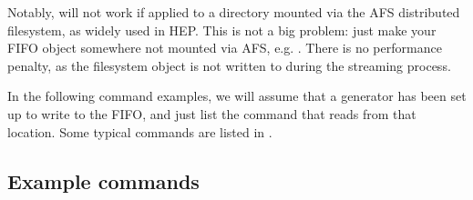 \documentclass{JHEP3}
\begin{document}
Notably,  will not work if applied to a directory mounted via the
AFS distributed filesystem, as widely used in HEP. This is not a big problem:
just make your FIFO object somewhere not mounted via AFS, e.g. . There
is no performance penalty, as the filesystem object is not written to during the
streaming process.

In the following command examples, we will assume that a generator has been set
up to write to the  FIFO, and just list the  command
that reads from that location. Some typical  commands are
listed in .


\subsection{Example  commands}
\end{document}
